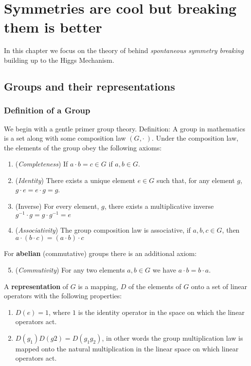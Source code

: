 \chapter{Symmetries are cool but breaking them is better}
In this chapter we focus on the theory of behind \textit{spontaneous symmetry breaking} building up to the Higgs Mechanism. 
\section{Groups and their representations}
\subsection{Definition of a Group}
We begin with a gentle primer group theory. 
Definition: A group in mathematics is a set along with some composition law $(G,\cdot\ )$. Under the composition law, the elements of the group obey the following axioms: 
\begin{enumerate}
    \item (\textit{Completeness}) If $a\cdot b = c\in G$ if $a,b\in G$.
    \item (\textit{Identity}) There exists a unique element $e\in G$ such that, for any element $g$, $g\cdot e = e\cdot g = g$.
    \item (Inverse) For every element, $g$, there exists a multiplicative inverse $g^{-1}\cdot g = g\cdot g^{-1}=e$
    \item (\textit{Associativity}) The group composition law is associative, if $a, b, c\in G$, then $a\cdot(b\cdot c) = (a\cdot b)\cdot c$
\end{enumerate}
For \textbf{abelian} (commutative) groups there is an additional axiom: 
\begin{enumerate}
    \setcounter{enumi}{4}
    \item (\textit{Commutivity}) For any two elements $a,b\in G$ we have $a\cdot b = b\cdot a$. 
\end{enumerate}

A \textbf{representation} of $G$ is a mapping, $D$ of the elements of $G$ onto a set of linear operators with the following properties: 
\begin{enumerate}
    \item $D(e) = 1$, where $1$ is the identity operator in the space on which the linear operators act. 
    \item $D(g_1)D(g2) = D(g_1g_2)$, in other words the group multiplication law is mapped onto the natural multiplication in the linear space on which linear operators act. 
\end{enumerate}

